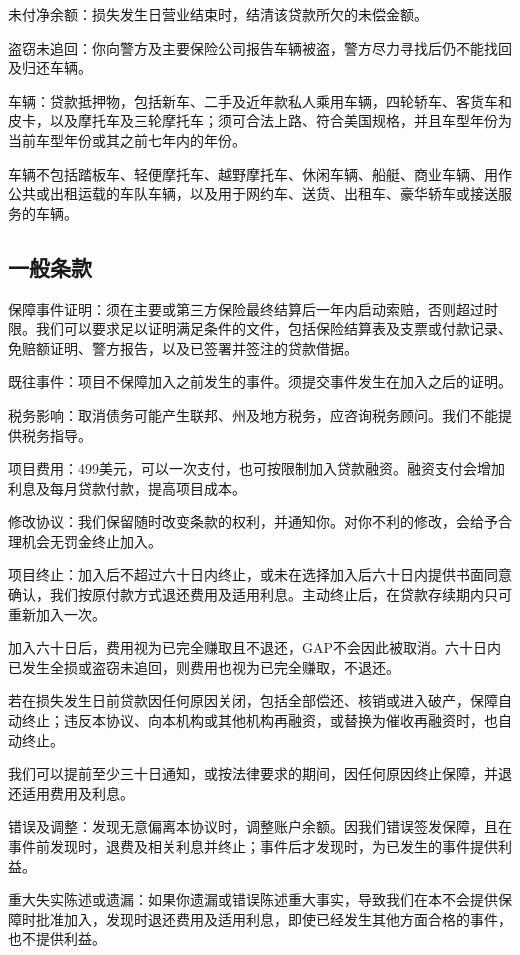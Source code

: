 \documentclass[UTF8,fontset=none,11pt,a4paper]{ctexart}
\begin{document}
未付净余额：损失发生日营业结束时，结清该贷款所欠的未偿金额。


盗窃未追回：你向警方及主要保险公司报告车辆被盗，警方尽力寻找后仍不能找回及归还车辆。


车辆：贷款抵押物，包括新车、二手及近年款私人乘用车辆，四轮轿车、客货车和皮卡，以及摩托车及三轮摩托车；须可合法上路、符合美国规格，并且车型年份为当前车型年份或其之前七年内的年份。


车辆不包括踏板车、轻便摩托车、越野摩托车、休闲车辆、船艇、商业车辆、用作公共或出租运载的车队车辆，以及用于网约车、送货、出租车、豪华轿车或接送服务的车辆。


\subsection*{一般条款}
保障事件证明：须在主要或第三方保险最终结算后一年内启动索赔，否则超过时限。我们可以要求足以证明满足条件的文件，包括保险结算表及支票或付款记录、免赔额证明、警方报告，以及已签署并签注的贷款借据。


既往事件：项目不保障加入之前发生的事件。须提交事件发生在加入之后的证明。


税务影响：取消债务可能产生联邦、州及地方税务，应咨询税务顾问。我们不能提供税务指导。


项目费用：499美元，可以一次支付，也可按限制加入贷款融资。融资支付会增加利息及每月贷款付款，提高项目成本。


修改协议：我们保留随时改变条款的权利，并通知你。对你不利的修改，会给予合理机会无罚金终止加入。


项目终止：加入后不超过六十日内终止，或未在选择加入后六十日内提供书面同意确认，我们按原付款方式退还费用及适用利息。主动终止后，在贷款存续期内只可重新加入一次。


加入六十日后，费用视为已完全赚取且不退还，GAP不会因此被取消。六十日内已发生全损或盗窃未追回，则费用也视为已完全赚取，不退还。


若在损失发生日前贷款因任何原因关闭，包括全部偿还、核销或进入破产，保障自动终止；违反本协议、向本机构或其他机构再融资，或替换为催收再融资时，也自动终止。


我们可以提前至少三十日通知，或按法律要求的期间，因任何原因终止保障，并退还适用费用及利息。


错误及调整：发现无意偏离本协议时，调整账户余额。因我们错误签发保障，且在事件前发现时，退费及相关利息并终止；事件后才发现时，为已发生的事件提供利益。


重大失实陈述或遗漏：如果你遗漏或错误陈述重大事实，导致我们在本不会提供保障时批准加入，发现时退还费用及适用利息，即使已经发生其他方面合格的事件，也不提供利益。
\end{document}
